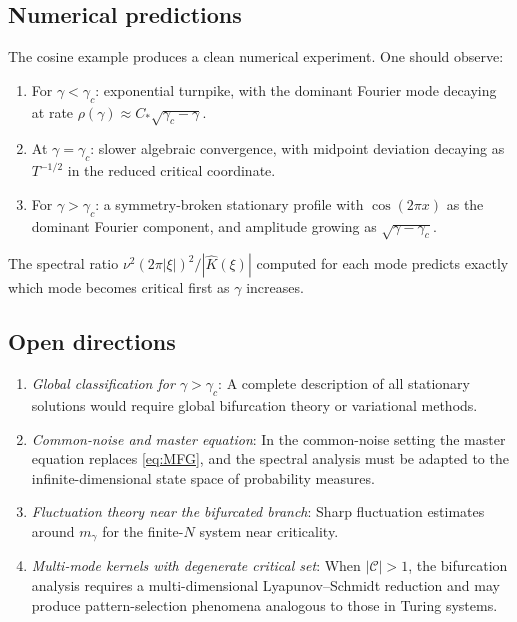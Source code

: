 \documentclass[11pt]{amsart}
\theoremstyle{definition}
\theoremstyle{remark}
\newcommand{\cC}{\mathcal{C}}
\newcommand{\Kh}{\widehat{K}}
\newcommand{\gamc}{\gamma_c}
\begin{document}
\subsection{Numerical predictions}
\label{sub:numerical}

The cosine example produces a clean numerical experiment. One should observe:
\begin{enumerate}[label=\textup{(\arabic*)},leftmargin=2em]
\item For $\gamma<\gamc$: exponential turnpike, with the dominant Fourier mode decaying at rate $\rho(\gamma)\approx C_\ast\sqrt{\gamc-\gamma}$.
\item At $\gamma=\gamc$: slower algebraic convergence, with midpoint deviation decaying as $T^{-1/2}$ in the reduced critical coordinate.
\item For $\gamma>\gamc$: a symmetry-broken stationary profile with $\cos(2\pi x)$ as the dominant Fourier component, and amplitude growing as $\sqrt{\gamma-\gamc}$.
\end{enumerate}
The spectral ratio $\nu^2(2\pi|\xi|)^2/|\Kh(\xi)|$ computed for each mode predicts exactly which mode becomes critical first as $\gamma$ increases.

\subsection{Open directions}
\label{sub:open}

\begin{enumerate}[label=\textup{(\arabic*)},leftmargin=2em]
\item \textit{Global classification for $\gamma>\gamc$}: A complete description of all stationary solutions would require global bifurcation theory or variational methods.
\item \textit{Common-noise and master equation}: In the common-noise setting the master equation replaces \eqref{eq:MFG}, and the spectral analysis must be adapted to the infinite-dimensional state space of probability measures.
\item \textit{Fluctuation theory near the bifurcated branch}: Sharp fluctuation estimates around $m_\gamma$ for the finite-$N$ system near criticality.
\item \textit{Multi-mode kernels with degenerate critical set}: When $|\cC|>1$, the bifurcation analysis requires a multi-dimensional Lyapunov--Schmidt reduction and may produce pattern-selection phenomena analogous to those in Turing systems.
\end{enumerate}
\end{document}
